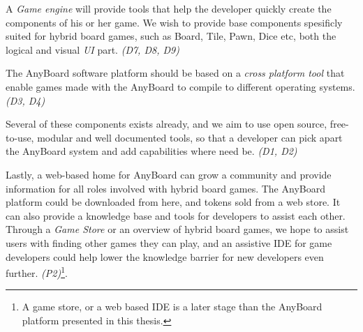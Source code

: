 A \emph{Game engine} will provide tools that help the developer quickly create the components of his or her game. We wish to provide base components spesificly suited for hybrid board games, such as Board, Tile, Pawn, Dice etc, both the logical and visual \emph{UI} part. \emph{(D7, D8, D9)}

The AnyBoard software platform should be based on a \emph{cross platform tool} that enable games made with the AnyBoard to compile to different operating systems. \emph{(D3, D4)}

Several of these components exists already, and we aim to use open source, free-to-use, modular and well documented tools, so that a developer can pick apart the AnyBoard system and add capabilities where need be. \emph{(D1, D2)}

Lastly, a web-based home for AnyBoard can grow a community and provide information for all roles involved with hybrid board games. The AnyBoard platform could be downloaded from here, and tokens sold from a web store. It can also provide a knowledge base and tools for developers to assist each other. Through a \emph{Game Store} or an overview of hybrid board games, we hope to assist users with finding other games they can play, and an assistive IDE for game developers could help lower the knowledge barrier for new developers even further. \emph{(P2)}\footnote{A game store, or a web based IDE is a later stage than the AnyBoard platform presented in this thesis.}. 




